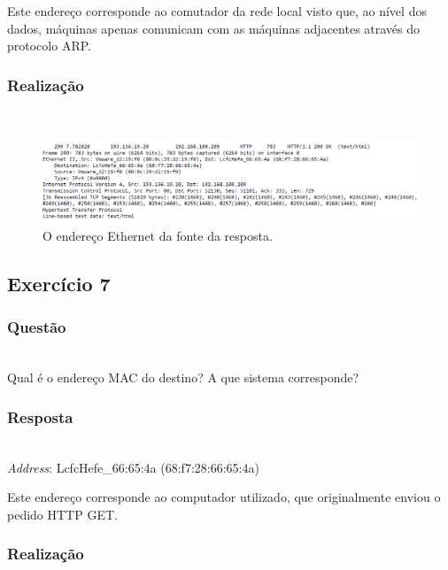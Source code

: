 \documentclass{llncs}
\begin{document}
Este endereço corresponde ao comutador da rede local visto que, ao nível dos dados, máquinas apenas comunicam com as máquinas adjacentes através do protocolo ARP.

\subsubsection{Realização}\rule[-10pt]{0pt}{10pt}\\

\begin{figure}
  \begin{center}
  \includegraphics[scale=0.35]{imagens/HTTPresponse.png} 
  \end{center}
  \caption{O endereço Ethernet da fonte da resposta.}
  \label{fig:ethernet_response_source}
\end{figure}

\clearpage
\subsection{Exercício 7}
\subsubsection{Questão}\rule[-10pt]{0pt}{10pt}\\

Qual é o endereço MAC do destino? A que sistema corresponde?

\subsubsection{Resposta}\rule[-10pt]{0pt}{10pt}\\

\textit{Address}: LcfcHefe\_66:65:4a (68:f7:28:66:65:4a)

Este endereço corresponde ao computador utilizado, que originalmente enviou o pedido HTTP GET.

\subsubsection{Realização}\rule[-10pt]{0pt}{10pt}\\
\end{document}
